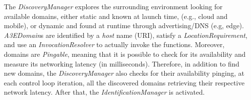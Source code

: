 The \textit{DiscoveryManager} explores the surrounding environment looking for available domains, either static and known at launch time, (e.g., cloud and mobile), or dynamic and found at runtime through advertising/DNS (e.g, edge).  
\textit{A3EDomain}s are identified by a \textit{host} name (URI), satisfy a \textit{LocationRequirement}, and use an \textit{InvocationResolver} to actually invoke the functions. Moreover, domains are \textit{Pingable}, meaning that it is possible to check for its availability and measure its networking latency (in milliseconds). 
Therefore, in addition to find new domains, the \textit{DiscoveryManager} also checks for their availability pinging, at each control loop iteration, all the discovered domains retrieving their respective network latency. %
After that, the \textit{IdentificationManager} is activated. %

